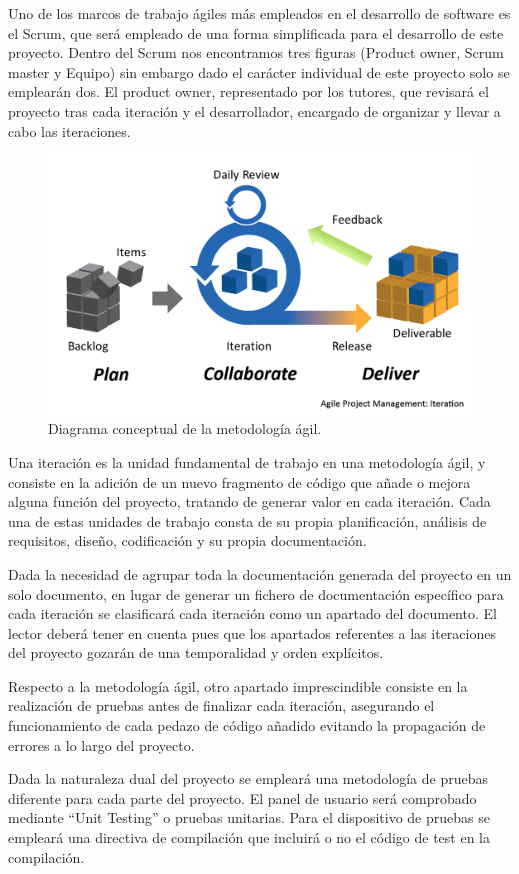     Uno de los marcos de trabajo ágiles más empleados en el desarrollo de software es el Scrum, que será empleado de una forma simplificada para el desarrollo de este proyecto. Dentro del Scrum nos encontramos tres figuras (Product owner, Scrum master y Equipo) sin embargo dado el carácter individual de este proyecto solo se emplearán dos. El product owner, representado por los tutores, que revisará el proyecto tras cada iteración y el desarrollador, encargado de organizar y llevar a cabo las iteraciones.

    \begin{figure}[H]  
        \centering
            \includegraphics[width =0.9\linewidth]{figuras/Agile.png}
        \caption{Diagrama conceptual de la metodología ágil.}
        \label{fig:agile}
    \end{figure}

    Una iteración es la unidad fundamental de trabajo en una metodología ágil, y consiste en la adición de un nuevo fragmento de código que añade o mejora alguna función del proyecto, tratando de generar valor en cada iteración. Cada una de estas unidades de trabajo consta de su propia planificación, análisis de requisitos, diseño, codificación y su propia documentación.

    Dada la necesidad de agrupar toda la documentación generada del proyecto en un solo documento, en lugar de generar un fichero de documentación específico para cada iteración se clasificará cada iteración como un apartado del documento. El lector deberá tener en cuenta pues que los apartados referentes a las iteraciones del proyecto gozarán de una temporalidad y orden explícitos.
    
    Respecto a la metodología ágil, otro apartado imprescindible consiste en la realización de pruebas antes de finalizar cada iteración, asegurando el funcionamiento de cada pedazo de código añadido evitando la propagación de errores a lo largo del proyecto.
    
    Dada la naturaleza dual del proyecto se empleará una metodología de pruebas diferente para cada parte del proyecto. El panel de usuario será comprobado mediante ``Unit Testing'' o pruebas unitarias. Para el dispositivo de pruebas se empleará una directiva de compilación que incluirá o no el código de test en la compilación.

\clearpage

\chapterend{}
